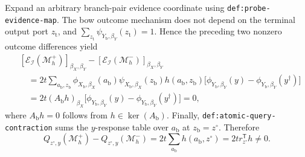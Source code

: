 Expand an arbitrary branch-pair evidence coordinate using \texttt{def:probe-evidence-map}.  The bow outcome mechanism does not depend on the terminal output port \(z_{\mathrm t}\), and \(\sum_{z_{\mathrm t}}\psi_{Y_{\mathrm b},\beta_Y}(z_{\mathrm t})=1\).  Hence the preceding two nonzero outcome differences yield
\[
\begin{aligned}
 &[\mathcal E_{\mathcal I}(\mathcal M_h^+)]_{\beta_X,\beta_Y}
 -[\mathcal E_{\mathcal I}(\mathcal M_h^-)]_{\beta_X,\beta_Y}\\
 &\quad=2t\sum_{a_{\mathrm b},z_{\mathrm b}}
 \phi_{X_{\mathrm b},\beta_X}(a_{\mathrm b})
 \psi_{X_{\mathrm b},\beta_X}(z_{\mathrm b})h(a_{\mathrm b},z_{\mathrm b})
 \bigl[\phi_{Y_{\mathrm b},\beta_Y}(y)
 -\phi_{Y_{\mathrm b},\beta_Y}(y^{\dagger})\bigr]\\
 &\quad=2t(A_{\mathrm b}h)_{\beta_X}
 \bigl[\phi_{Y_{\mathrm b},\beta_Y}(y)
 -\phi_{Y_{\mathrm b},\beta_Y}(y^{\dagger})\bigr]=0,
\end{aligned}
\]
where \(A_{\mathrm b}h=0\) follows from \(h\in\ker(A_{\mathrm b})\).  Finally, \texttt{def:atomic-query-contraction} sums the \(y\)-response table over \(a_{\mathrm b}\) at \(z_{\mathrm b}=z^{\circ}\).  Therefore
\[
 Q_{z^{\circ},y}(\mathcal M_h^+)-Q_{z^{\circ},y}(\mathcal M_h^-)
 =2t\sum_{a_{\mathrm b}}h(a_{\mathrm b},z^{\circ})
 =2t r_{z^{\circ}}^{\mathsf T}h\ne0.
\]